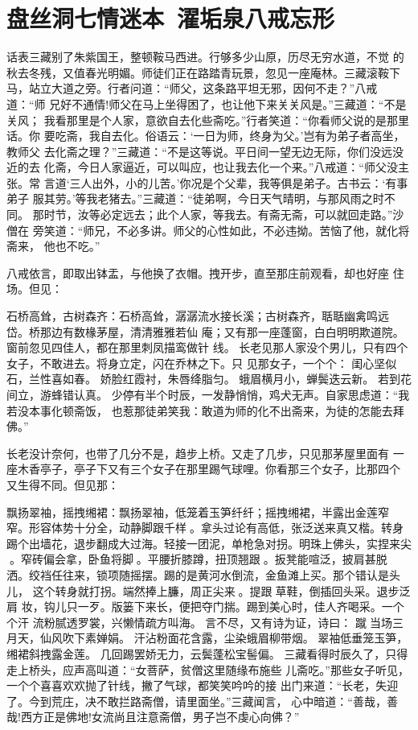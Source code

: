 \chapter{盘丝洞七情迷本~濯垢泉八戒忘形}

话表三藏别了朱紫国王，整顿鞍马西进。行够多少山原，历尽无穷水道，不觉
的秋去冬残，又值春光明媚。师徒们正在路踏青玩景，忽见一座庵林。三藏滚鞍下
马，站立大道之旁。行者问道：“师父，这条路平坦无邪，因何不走？”八戒道：“师
兄好不通情!师父在马上坐得困了，也让他下来关关风是。”三藏道：“不是关风；
我看那里是个人家，意欲自去化些斋吃。”行者笑道：“你看师父说的是那里话。你
要吃斋，我自去化。俗语云：‘一日为师，终身为父。’岂有为弟子者高坐，教师父
去化斋之理？”三藏道：“不是这等说。平日间一望无边无际，你们没远没近的去
化斋，今日人家逼近，可以叫应，也让我去化一个来。”八戒道：“师父没主张。常
言道‘三人出外，小的儿苦。’你况是个父辈，我等俱是弟子。古书云：‘有事弟子
服其劳。’等我老猪去。”三藏道：“徒弟啊，今日天气晴明，与那风雨之时不同。
那时节，汝等必定远去；此个人家，等我去。有斋无斋，可以就回走路。”沙僧在
旁笑道：“师兄，不必多讲。师父的心性如此，不必违拗。苦恼了他，就化将斋来，
他也不吃。”

八戒依言，即取出钵盂，与他换了衣帽。拽开步，直至那庄前观看，却也好座
住场。但见：

石桥高耸，古树森齐：石桥高耸，潺潺流水接长溪；古树森齐，聒聒幽禽鸣远
岱。桥那边有数椽茅屋，清清雅雅若仙
庵；又有那一座蓬窗，白白明明欺道院。窗前忽见四佳人，都在那里刺凤描鸾做针
线。
长老见那人家没个男儿，只有四个女子，不敢进去。将身立定，闪在乔林之下。只
见那女子，一个个：
闺心坚似石，兰性喜如春。
娇脸红霞衬，朱唇绛脂匀。
蛾眉横月小，蝉鬓迭云新。
若到花间立，游蜂错认真。
少停有半个时辰，一发静悄悄，鸡犬无声。自家思虑道：“我若没本事化顿斋饭，
也惹那徒弟笑我：敢道为师的化不出斋来，为徒的怎能去拜佛。”

长老没计奈何，也带了几分不是，趋步上桥。又走了几步，只见那茅屋里面有
一座木香亭子，亭子下又有三个女子在那里踢气球哩。你看那三个女子，比那四个
又生得不同。但见那：

飘扬翠袖，摇拽缃裙：飘扬翠袖，低笼着玉笋纤纤；摇拽缃裙，半露出金莲窄
窄。形容体势十分全，动静脚跟千样。拿头过论有高低，张泛送来真又楷。转身
踢个出墙花，退步翻成大过海。轻接一团泥，单枪急对拐。明珠上佛头，实捏来尖
。窄砖偏会拿，卧鱼将脚。平腰折膝蹲，扭顶翘跟。扳凳能喧泛，披肩甚脱
洒。绞裆任往来，锁项随摇摆。踢的是黄河水倒流，金鱼滩上买。那个错认是头儿，
这个转身就打拐。端然捧上臁，周正尖来。提跟草鞋，倒插回头采。退步泛肩
妆，钩儿只一歹。版篓下来长，便把夺门揣。踢到美心时，佳人齐喝采。一个个汗
流粉腻透罗裳，兴懒情疏方叫海。
言不尽，又有诗为证，诗曰：
蹴当场三月天，仙风吹下素婵娟。
汗沾粉面花含露，尘染蛾眉柳带烟。
翠袖低垂笼玉笋，缃裙斜拽露金莲。
几回踢罢娇无力，云鬓蓬松宝髻偏。
三藏看得时辰久了，只得走上桥头，应声高叫道：“女菩萨，贫僧这里随缘布施些
儿斋吃。”那些女子听见，一个个喜喜欢欢抛了针线，撇了气球，都笑笑吟吟的接
出门来道：“长老，失迎了。今到荒庄，决不敢拦路斋僧，请里面坐。”三藏闻言，
心中暗道：“善哉，善哉!西方正是佛地!女流尚且注意斋僧，男子岂不虔心向佛？”

